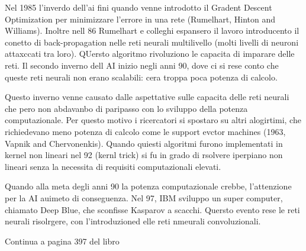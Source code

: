 Nel 1985 l'inverdo dell'ai fini quando venne introdotto il Gradent Descent Optimization per minimizzare l'errore in una rete (Rumelhart, Hinton and Williams). Inoltre nell 86 Rumelhart e colleghi espansero il lavoro introducento il conetto di back-propagation nelle reti neurali multilivello (molti livelli di neuroni attaxccati tra loro). QUersto algoritmo rivoluziono le capacita di imparare delle reti. Il secondo inverno dell AI inizio negli anni 90, dove ci si rese conto che queste reti neurali non erano scalabili: cera troppa poca potenza di calcolo.

Questo inverno venne causato dalle aspettative sulle capacita delle reti neurali che pero non abdavanbo di paripasso con lo sviluppo della potenza computazionale. Per questo motivo i ricercatori si spostaro su altri alogirtimi, che richiedevano meno potenza di calcolo come le support evctor machines (1963, Vapnik and Chervonenkis). Quando quiesti algoritmi furono implementati in kernel non lineari nel 92 (kernl trick) si fu in grado di rsolvere iperpiano non lineari senza la necessita di requisiti computazionali elevati. 

Quando alla meta degli anni 90 la potenza computazionale crebbe, l'attenzione per la AI auimeto di conseguenza. Nel 97, IBM sviluppo un super computer, chiamato Deep Blue, che sconfisse Kasparov a scacchi. Quersto evento rese le reti neurali risolrgere, con l'introduzioned elle reti nmeurali convoluzionali.

Continua a pagina 397 del libro\,\cite{muthukrishnan2020brief}




\begin{comment}
    Video Enkk:         https://www.youtube.com/watch?v=QB4FR8U0N6g&t=1885s
    Deep learning:      https://www.nature.com/articles/nature14539
    Storia:             https://books.google.it/books?hl=it&lr=&id=GpYFEAAAQBAJ&oi=fnd&pg=PA393&dq=History+of+artificial+intelligence&ots=V4Y3JAo1le&sig=vCrUSwvkSHjayS99EKLAHkEa_8s&redir_esc=y#v=onepage&q=History%
\end{comment}


